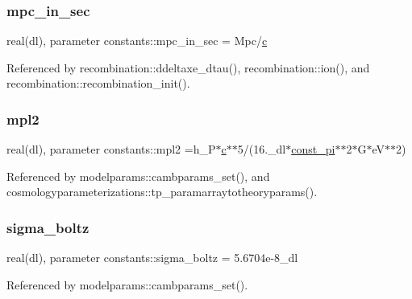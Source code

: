 \subsubsection{\texorpdfstring{mpc\+\_\+in\+\_\+sec}{mpc\_in\_sec}}
{\footnotesize\ttfamily real(dl), parameter constants\+::mpc\+\_\+in\+\_\+sec = Mpc/\mbox{\hyperlink{namespaceconstants_acf9c352e48b37fa8a9aff3e5957246b8}{c}}}



Referenced by recombination\+::ddeltaxe\+\_\+dtau(), recombination\+::ion(), and recombination\+::recombination\+\_\+init().

\mbox{\label{namespaceconstants_a98f4ee82e62b531455bde7a7077a9792}} 
\subsubsection{\texorpdfstring{mpl2}{mpl2}}
{\footnotesize\ttfamily real(dl), parameter constants\+::mpl2 =h\+\_\+P$\ast$\mbox{\hyperlink{namespaceconstants_acf9c352e48b37fa8a9aff3e5957246b8}{c}}$\ast$$\ast$5/(16.\+\_\+dl$\ast$\mbox{\hyperlink{namespaceconstants_ae6b5af15d3fb28a3dba468486c548447}{const\+\_\+pi}}$\ast$$\ast$2$\ast$G$\ast$eV$\ast$$\ast$2)}



Referenced by modelparams\+::cambparams\+\_\+set(), and cosmologyparameterizations\+::tp\+\_\+paramarraytotheoryparams().

\mbox{\label{namespaceconstants_a7c87c2c8bfe2b2f647e1ebaf8f66d6df}} 
\subsubsection{\texorpdfstring{sigma\+\_\+boltz}{sigma\_boltz}}
{\footnotesize\ttfamily real(dl), parameter constants\+::sigma\+\_\+boltz = 5.\+6704e-\/8\+\_\+dl}



Referenced by modelparams\+::cambparams\+\_\+set().

\mbox{\label{namespaceconstants_aaf2f1c6fdfe22c4836ab4d2a47e53373}} 
